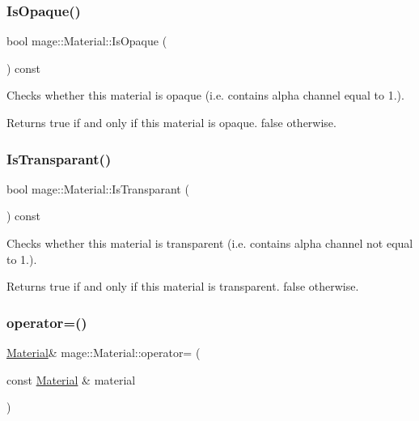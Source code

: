 \subsubsection{\texorpdfstring{Is\+Opaque()}{IsOpaque()}}
{\footnotesize\ttfamily bool mage\+::\+Material\+::\+Is\+Opaque (\begin{DoxyParamCaption}{ }\end{DoxyParamCaption}) const\hspace{0.3cm}{\ttfamily [noexcept]}}

Checks whether this material is opaque (i.\+e. contains alpha channel equal to 1.).

\begin{DoxyReturn}{Returns}
{\ttfamily true} if and only if this material is opaque. {\ttfamily false} otherwise. 
\end{DoxyReturn}
\hypertarget{structmage_1_1_material_a6a62e3889887e77259070e1f9cd9150f}{}\label{structmage_1_1_material_a6a62e3889887e77259070e1f9cd9150f} 
\subsubsection{\texorpdfstring{Is\+Transparant()}{IsTransparant()}}
{\footnotesize\ttfamily bool mage\+::\+Material\+::\+Is\+Transparant (\begin{DoxyParamCaption}{ }\end{DoxyParamCaption}) const\hspace{0.3cm}{\ttfamily [noexcept]}}

Checks whether this material is transparent (i.\+e. contains alpha channel not equal to 1.).

\begin{DoxyReturn}{Returns}
{\ttfamily true} if and only if this material is transparent. {\ttfamily false} otherwise. 
\end{DoxyReturn}
\hypertarget{structmage_1_1_material_a7ebc9986924ca13ae8468005518dcfc7}{}\label{structmage_1_1_material_a7ebc9986924ca13ae8468005518dcfc7} 
\subsubsection{\texorpdfstring{operator=()}{operator=()}\hspace{0.1cm}{\footnotesize\ttfamily [1/2]}}
{\footnotesize\ttfamily \hyperlink{structmage_1_1_material}{Material}\& mage\+::\+Material\+::operator= (\begin{DoxyParamCaption}\item[{const \hyperlink{structmage_1_1_material}{Material} \&}]{material }\end{DoxyParamCaption})\hspace{0.3cm}{\ttfamily [default]}}

